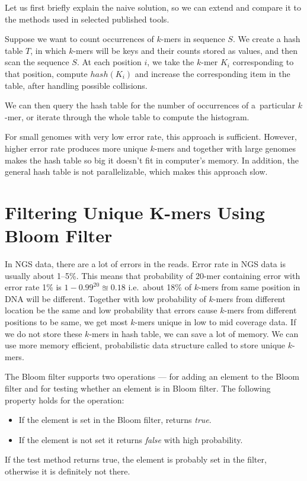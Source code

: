 Let us first briefly explain the naive solution, so we can extend and compare it to the methods used in selected published tools.

Suppose we want to count occurrences of $k$-mers in sequence $S$.
We create a hash table $T$, in which $k$-mers will be keys and their counts stored as values, and then scan the sequence $S$.
At each position $i$, we take the $k$-mer $K_i$ corresponding to that  position, compute $hash(K_i)$ and increase the corresponding item in the table, after handling possible collisions.

We can then query the hash table for the number of occurrences of a~particular $k$-mer, or iterate through the whole table to compute the histogram.

For small genomes with very low error rate, this approach is sufficient. However, higher error rate produces more unique $k$-mers and together with large genomes makes the hash table so big it doesn't fit in computer's memory. In addition, the general hash table is not parallelizable, which makes this approach slow.

\section[Filtering Unique K-mers]{Filtering Unique K-mers Using Bloom Filter}

In NGS data, there are a lot of errors in the reads. Error rate in NGS data is usually about 1--5\%. This means that probability of 20-mer containing error with error rate 1\% is $1 - 0.99^{20} \approxeq 0.18$ i.e.\ about 18\% of $k$-mers from same position in DNA will be different. Together with low probability of $k$-mers from different location be the same and low probability that errors cause $k$-mers from different positions to be same, we get most $k$-mers unique in low to mid coverage data. If we do not store these $k$-mers in hash table, we can save a lot of memory. We can use more memory efficient, probabilistic data structure called \cite{bloomfilter} to store unique $k$-mers.

The Bloom filter supports two operations ---  for adding an element to the Bloom filter and  for testing whether an element is in Bloom filter. The following property holds for the  operation:
\begin{itemize}
  \item If the element is set in the Bloom filter, returns \emph{true}.
  \item If the element is not set it returns \emph{false} with high probability.
\end{itemize}
If the test method returns true, the element is probably set in the filter, otherwise it is definitely not there.

